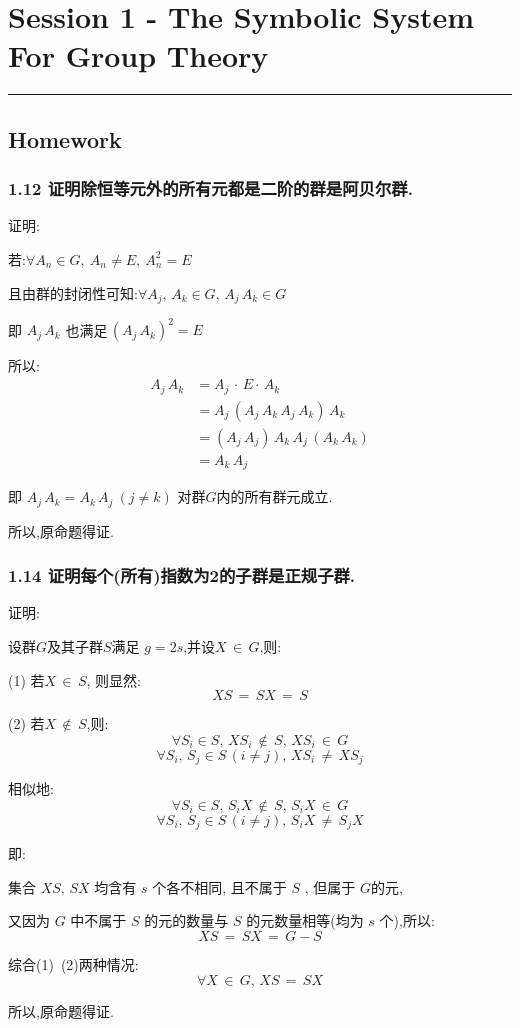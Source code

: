 \section{Session 1 - The Symbolic System For Group Theory}
\vspace{-15pt}\noindent\rule{\textwidth}{0.1pt}\vspace{-10pt}
    \subsection{Homework}
    \subsubsection{1.12 \textnormal{证明除恒等元外的所有元都是二阶的群是阿贝尔群}.}
    {\color{hwSolution}
    \noindent 证明:

        若:$\forall A_n \in G ,~A_n \neq E ,~A_n^2 = E$  

        且由群的封闭性可知:$\forall A_j,\,A_k \in G,\,A_j\,A_k \in G$
        
        即 $A_j\,A_k$ 也满足\,$\left(A_j\,A_k\right)^2 = E$

        所以:
        \begin{align*}
            A_j\,A_k    &= A_j\,\cdot\,E\cdot\,A_k\\
                        &= A_j\,\left(A_j\,A_k\,A_j\,A_k\right)\,A_k\\
                        &= \left(A_j\,A_j\right)\,A_k\,A_j\,\left(A_k\,A_k\right)\\
                        &= A_k\,A_j
        \end{align*}

        即 $A_j\,A_k = A_k\,A_j~(j\neq k)$ 对群$G$内的所有群元成立.

        所以,原命题得证.
    }

    \subsubsection{1.14 \textnormal{证明每个(所有)指数为2的子群是正规子群}.}
    {\color{hwSolution}
    \noindent 证明:

        设群$G$及其子群$S$满足 $g = 2s$,并设$X\,\in\,G$,则:

        (1) 若$X\,\in\,S$, 则显然:
        \[ XS\,=\,SX\,=\,S \]

        (2) 若$X\,\notin\,S$,则:
        \[\forall S_i \in S,\,XS_i\,\notin\,S,\,XS_i\,\in\,G\]
        \[\forall S_i,\,S_j \in S\,(i\neq j),\,XS_i\,\neq\,XS_j\]

        相似地:
        \[\forall S_i \in S,\,S_iX\,\notin\,S,\,S_iX\,\in\,G\]
        \[\forall S_i,\,S_j \in S\,(i\neq j),\,S_iX\,\neq\,S_jX\]

        即:
        
        集合 $XS,\,SX$ 均含有 $s$ 个各不相同, 且不属于 $S$ , 但属于 $G$的元,
        
        又因为 $G$ 中不属于 $S$ 的元的数量与 $S$ 的元数量相等(均为 $s$ 个),所以:
        \[ XS\,=\,SX\,=\,G-S \]

        综合(1)~(2)两种情况: 
        \[~\forall X\,\in\,G,\,XS\,=\,SX~\]

        所以,原命题得证.
    }


